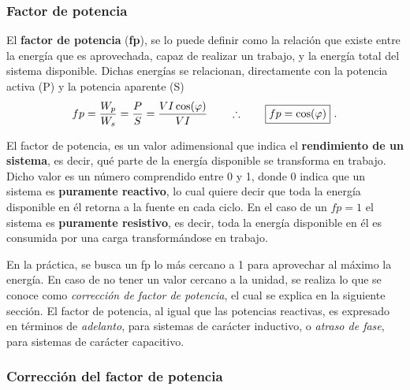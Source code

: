          \subsubsection{Factor de potencia}
         
         El \textbf{factor de potencia} (\textbf{fp}), se lo puede definir como la relación que
               existe entre la energía que es aprovechada, capaz de realizar un trabajo, y la 
               energía total del sistema disponible.
               Dichas energías se relacionan, directamente con la potencia activa (P) y 
               la potencia aparente (S) 
               \begin{equation}
               fp = \frac{W_p}{W_s} = \frac{P}{S} = \dfrac{V I \cos(\varphi)}{V I} \notag \\
                        \hspace{20pt} \therefore \hspace{20pt} \boxed{fp = \cos(\varphi)}~.\label{eqn:fpFinal} 
               \end{equation}

               El factor de potencia, es un valor adimensional que indica 
               el \textbf{rendimiento de un sistema}, es decir, qué parte de la energía disponible 
               se transforma en trabajo. Dicho valor es un número comprendido entre 0 y 1, 
               donde 0 indica que un sistema es \textbf{puramente reactivo}, lo cual quiere 
               decir que toda la energía disponible en él retorna a la fuente en cada ciclo. 
               En el caso de un $fp = 1$ el sistema es \textbf{puramente resistivo},
               es decir, toda la energía disponible en él es consumida por una carga
               transformándose en trabajo.

               En la práctica, se busca un fp lo más
               cercano a 1 para aprovechar al máximo la energía. En caso de no tener un valor
               cercano a la unidad, se realiza lo que se conoce como \textit{corrección de
               factor de potencia}, el cual se explica en la siguiente sección.
               El factor de potencia, al igual que las potencias reactivas, es expresado en 
               términos de \textit{adelanto}, para sistemas de carácter inductivo, o 
               \textit{atraso de fase}, para sistemas de carácter capacitivo.

            \subsubsection{Corrección del factor de potencia}
               
